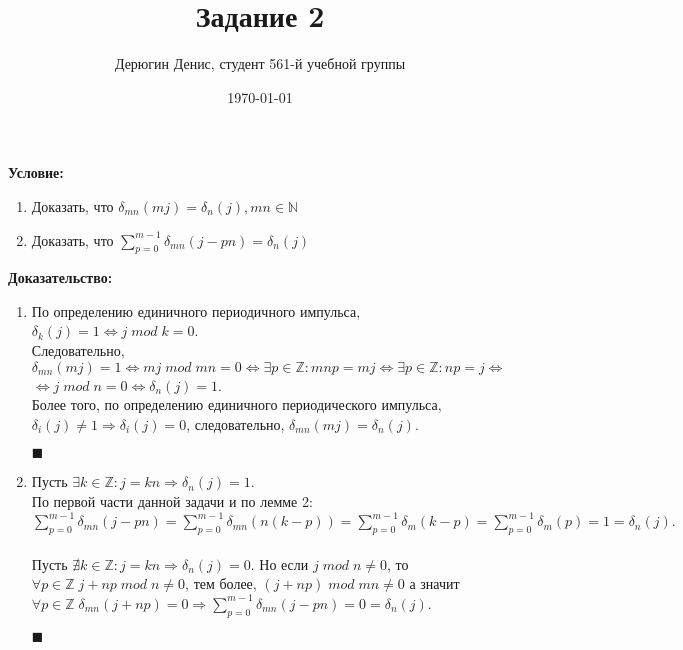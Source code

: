 \documentclass[38pt]{article}
\title{Задание 2}
\author{
	Дерюгин Денис, студент 561-й учебной группы
}
\date{\today}
\begin{document}
\maketitle
\large{
	\textbf{Условие:}
	\begin{enumerate}
		\item {Доказать, что $\delta_{mn}(mj) = \delta_n(j), mn \in \mathbb{N}$}
		\item {Доказать, что $\sum\limits_{p = 0}^{m - 1} \delta_{mn}(j - pn) = \delta_n(j)$}
	\end{enumerate}

	\textbf{Доказательство:}
	\begin{enumerate}
		\item По определению единичного периодичного импульса, $\delta_k(j) = 1 \Leftrightarrow j \;mod \;k = 0$.\\
		
			Следовательно,\\ $\delta_{mn}(mj) = 1 \Leftrightarrow mj \;mod \;mn = 0 \Leftrightarrow \exists p \in \mathbb{Z}: mnp = mj \Leftrightarrow \exists p \in \mathbb{Z}: np = j \Leftrightarrow $\\ $\Leftrightarrow j \;mod \;n = 0 \Leftrightarrow \delta_n(j) = 1$.\\
			Более того, по определению единичного периодического импульса, $\delta_i(j) \neq 1 \Rightarrow \delta_i(j) = 0$, следовательно, $\delta_{mn}(mj) = \delta_n(j)$.

	\begin{flushright}$\blacksquare$\end{flushright}
	
	\item Пусть $\exists k \in \mathbb{Z} : j = kn \Rightarrow \delta_n(j) = 1$.\\
	По первой части данной задачи и по лемме 2:\\
	$\sum\limits_{p = 0}^{m - 1} \delta_{mn}(j - pn) = \sum\limits_{p = 0}^{m - 1} \delta_{mn}(n(k - p)) = \sum\limits_{p = 0}^{m - 1} \delta_m(k - p) = \sum\limits_{p = 0}^{m - 1} \delta_m(p) = 1 = \delta_n(j).$\\
	\\

	Пусть $\nexists k \in \mathbb{Z} : j = kn \Rightarrow \delta_n(j) = 0$. Но если $j\;mod\;n \neq 0$, то $\forall p \in \mathbb{Z}\;j + np\;mod\;n \neq 0$, тем более, $(j + np)\;mod\;mn \neq 0$ а значит $\forall p \in \mathbb{Z} \;\delta_{mn}(j + np) = 0 \Rightarrow \sum\limits_{p = 0}^{m - 1} \delta_{mn}(j - pn) = 0 = \delta_n(j)$.

	\begin{flushright}$\blacksquare$\end{flushright}
	
	\end{enumerate}
	
}
\end{document}
